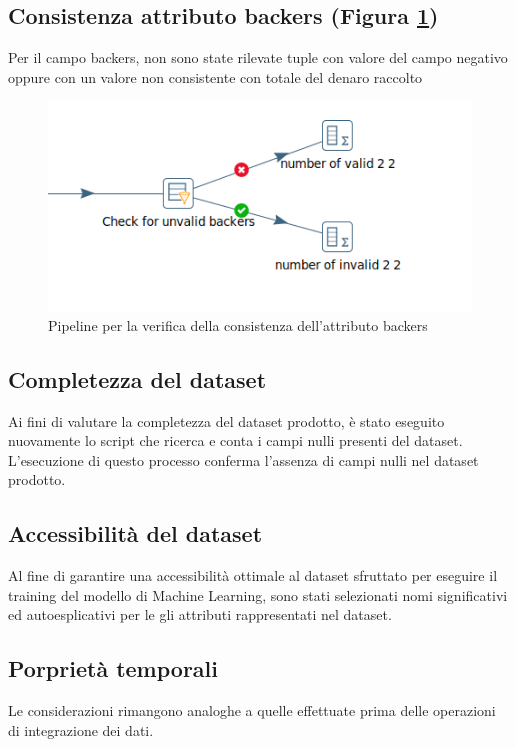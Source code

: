 \subsection{Consistenza attributo backers (Figura \ref{fig:dqtbackers})}
Per il campo backers, non sono state rilevate tuple con valore del campo negativo oppure con un valore non consistente con totale del denaro raccolto

\begin{figure}[h!]
	\centering
	\includegraphics[width=0.7\linewidth]{images/DQT_backers}
	\caption{Pipeline per la verifica della consistenza dell'attributo backers}
	\label{fig:dqtbackers}
\end{figure}

\subsection{Completezza del dataset}
Ai fini di valutare la completezza del dataset prodotto, è stato eseguito nuovamente lo script che ricerca e conta i campi nulli presenti del dataset. L'esecuzione di questo processo conferma l'assenza di campi nulli nel dataset prodotto.

\subsection{Accessibilità del dataset}
Al fine di garantire una accessibilità ottimale al dataset sfruttato per eseguire il training del modello di Machine Learning, sono stati selezionati nomi significativi ed autoesplicativi per le gli attributi rappresentati nel dataset.

\subsection{Porprietà temporali}
Le considerazioni rimangono analoghe a quelle effettuate prima delle operazioni di integrazione dei dati.

